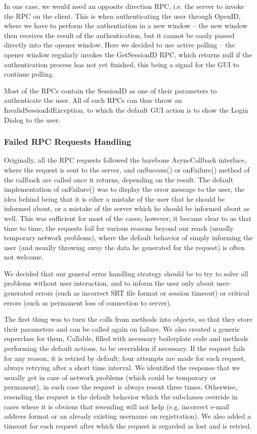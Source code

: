 In one case, we would need an opposite direction RPC, i.e. the server to invoke the RPC on the client. This is when authenticating the user through OpenID, where we have to perform the authentiation in a new window -- the new window then receives the result of the authentication, but it cannot be easily passed directly into the opener window. Here we decided to use active polling -- the opener window regularly invokes the GetSessionID RPC, which returns null if the authentication process has not yet finished, this being a signal for the GUI to continue polling.

Most of the RPCs contain the SessionID as one of their parameters to authenticate the user. All of such RPCs can thus throw an InvalidSessionIdException, to which the default GUI action is to show the Login Dialog to the user.

\subsubsection{Failed RPC Requests Handling}

Originally, all the RPC requests followed the barebone AsyncCallback interface, where the request is sent to the server, and onSuccess() or onFailure() method of the callback are called once it returns, depending on the result. The default implementation of onFailure() was to display the error message to the user, the idea behind being that it is eiher a mistake of the user that he should be informed about, or a mistake of the server which he should be informed about as well. This was sufficient for most of the cases; however, it became clear to us that time to time, the requests fail for various reasons beyond our reach (usually temporary network problems), where the default behavior of simply informing the user (and usually throwing away the data he generated for the request) is often not welcome.

We decided that our general error handling strategy should be to try to solve all problems without user interaction, and to inform the user only about user-generated errors (such as incorrect SRT file format or session timeout) or critical errors (such as permanent loss of connection to server).

The first thing was to turn the calls from methods into objects, so that they store their parameters and can be called again on failure. We also created a generic superclass for them, Callable, filled with necessary boilerplate code and methods performing the default actions, to be overridden if necessary. If the request fails for any reason, it is retried by default; four attempts are made for each request, always retrying after a short time interval. We identified the response that we usually get in case of network problems (which could be temporary or permanent), in such case the request is always resent three times. Otherwise, resending the request is the default behavior which the subclasses override in cases where it is obvious that resending will not help (e.g. incorrect e-mail address format or an already existing username on registration). We also added a timeout for each request after which the request is regarded as lost and is retried.

